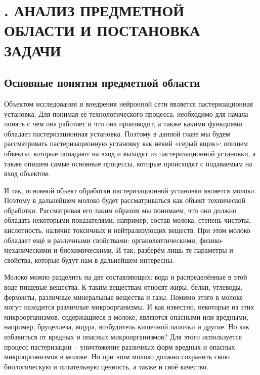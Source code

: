\sectionbreak \section*{
  \gostTitleFont
  . АНАЛИЗ ПРЕДМЕТНОЙ ОБЛАСТИ И ПОСТАНОВКА ЗАДАЧИ
}

\titlespace

\subsection*{ 
  \gostTitleFont
   Основные понятия предметной области
} 

\subtitlespace

{\gostFont

  \par \redline Объектом исследования и внедрения нейронной сети является пастеризационная установка. Для понимая её технологического процесса, необходимо для начала понять с чем она работает и что она производит, а также какими функциями обладает пастеризационная установка. Поэтому в данной главе мы будем рассматривать пастеризационную установку как некий «серый ящик»: опишем объекты, которые попадают на вход и выходят из пастеризационной установки, а также опишем самые основные процессы, которые происходят с подаваемым на вход объектом. 

  \par \redline И так, основной объект обработки пастеризационной установки является молоко. Поэтому в дальнейшем молоко будет рассматриваться как объект технической обработки. Рассматривая его таким образом мы понимаем, что оно должно обладать некоторыми показателями, например, состав молока, степень чистоты, кислотность, наличие токсичных и нейтрализующих веществ. При этом молоко обладает ещё и различными свойствами: органолептическими, физико-механическими и биохимическими. И так, разберём лишь те параметры и свойства, которые будут нам в дальнейшем интересны.

  \par \redline Молоко можно разделить на две составляющих: вода и распределённые в этой воде пищевые вещества. К таким веществам относят жиры, белки, углеводы, ферменты, различные минеральные вещества и газы. Помимо этого в молоке могут находится различные микроорганизмы. И как известно, некоторые из этих микроорганизмов, содержащиеся в молоке, являются опасными или вредными, например, бруцеллеза, ящура, возбудитель кишечной палочки и другие. Но как избавиться от вредных и опасных микроорганизмов?  Для этого используется процесс пастеризации {--} уничтожение различных форм вредных и опасных микроорганизмов в молоке. Но при этом молоко должно сохранить свою биологическую и питательную ценность, а также и своё качество. 

}

